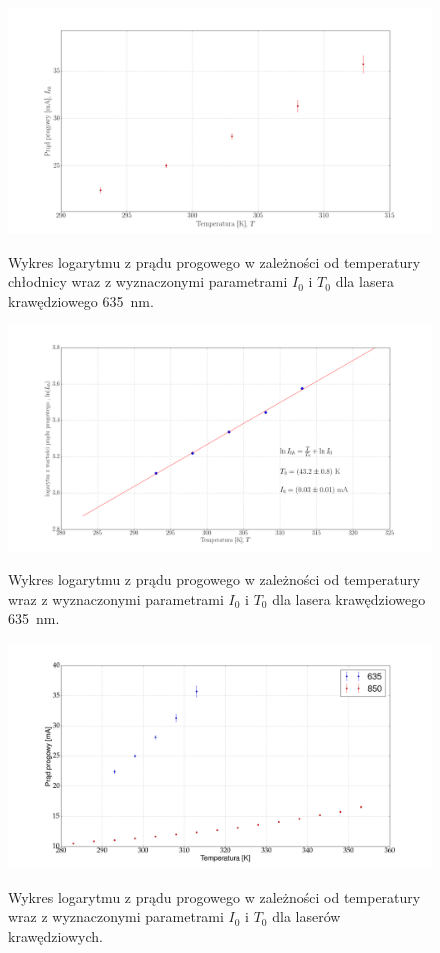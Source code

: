 \documentclass[a4paper, portrait,12pt]{mwrep}
\begin{document}
\begin{figure}
\center
  \includegraphics[scale=0.30]{plot635/plot_lin_i_th.png}
  \label{rys1}
  \caption{Wykres logarytmu z prądu progowego w zależności od temperatury chłodnicy wraz z wyznaczonymi parametrami $I_0$ i $T_0$ dla lasera krawędziowego 635 \,nm.} 
\end{figure}

\begin{figure}
\center
  \includegraphics[scale=0.30]{plot635/fit_i_0.png}
  \label{rys1}
  \caption{Wykres logarytmu z prądu progowego w zależności od temperatury wraz z wyznaczonymi parametrami $I_0$ i $T_0$ dla lasera krawędziowego 635 \,nm.} 
\end{figure}

\begin{figure}
\center
  \includegraphics[scale=0.30]{plotAll/wykres_krawedziowy_prad_progowy.png}
  \label{rys1}
  \caption{Wykres logarytmu z prądu progowego w zależności od temperatury wraz z wyznaczonymi parametrami $I_0$ i $T_0$ dla laserów krawędziowych.} 
\end{figure}
\end{document}
